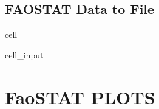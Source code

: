 \documentclass[letterpaper,10pt,english]{jupyterBook}
\begin{document}
\subsection{FAOSTAT Data to File}
\label{\detokenize{notebooks/data_exploration:faostat-data-to-file}}
\begin{sphinxuseclass}{cell}\begin{sphinxVerbatimInput}

\begin{sphinxuseclass}{cell_input}
\begin{sphinxVerbatim}[commandchars=\\\{\}]
  

\end{sphinxVerbatim}

\end{sphinxuseclass}\end{sphinxVerbatimInput}

\end{sphinxuseclass}

\section{FaoSTAT PLOTS}
\label{\detokenize{notebooks/data_exploration:faostat-plots}}
\end{document}

